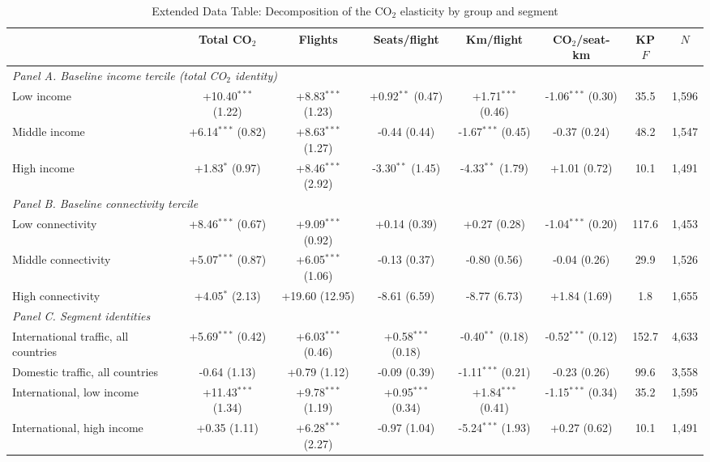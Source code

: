\begin{table}[htbp]
\centering
\begin{threeparttable}
\caption{Extended Data Table: Decomposition of the CO$_2$ elasticity by group and segment}
\label{tab:decomp_hetero}
\scriptsize
\begin{tabular}{lccccccc}
\toprule
 & Total CO$_2$ & Flights & Seats/flight & Km/flight & CO$_2$/seat-km & KP $F$ & $N$ \\
\midrule
\multicolumn{8}{l}{\textit{Panel A. Baseline income tercile (total CO$_2$ identity)}} \\
  Low income & +10.40$^{***}$ (1.22) & +8.83$^{***}$ (1.23) & +0.92$^{**}$ (0.47) & +1.71$^{***}$ (0.46) & -1.06$^{***}$ (0.30) & 35.5 & 1,596 \\
  Middle income & +6.14$^{***}$ (0.82) & +8.63$^{***}$ (1.27) & -0.44 (0.44) & -1.67$^{***}$ (0.45) & -0.37 (0.24) & 48.2 & 1,547 \\
  High income & +1.83$^{*}$ (0.97) & +8.46$^{***}$ (2.92) & -3.30$^{**}$ (1.45) & -4.33$^{**}$ (1.79) & +1.01 (0.72) & 10.1 & 1,491 \\
\multicolumn{8}{l}{\textit{Panel B. Baseline connectivity tercile}} \\
  Low connectivity & +8.46$^{***}$ (0.67) & +9.09$^{***}$ (0.92) & +0.14 (0.39) & +0.27 (0.28) & -1.04$^{***}$ (0.20) & 117.6 & 1,453 \\
  Middle connectivity & +5.07$^{***}$ (0.87) & +6.05$^{***}$ (1.06) & -0.13 (0.37) & -0.80 (0.56) & -0.04 (0.26) & 29.9 & 1,526 \\
  High connectivity & +4.05$^{*}$ (2.13) & +19.60 (12.95) & -8.61 (6.59) & -8.77 (6.73) & +1.84 (1.69) & 1.8 & 1,655 \\
\multicolumn{8}{l}{\textit{Panel C. Segment identities}} \\
  International traffic, all countries & +5.69$^{***}$ (0.42) & +6.03$^{***}$ (0.46) & +0.58$^{***}$ (0.18) & -0.40$^{**}$ (0.18) & -0.52$^{***}$ (0.12) & 152.7 & 4,633 \\
  Domestic traffic, all countries & -0.64 (1.13) & +0.79 (1.12) & -0.09 (0.39) & -1.11$^{***}$ (0.21) & -0.23 (0.26) & 99.6 & 3,558 \\
  International, low income & +11.43$^{***}$ (1.34) & +9.78$^{***}$ (1.19) & +0.95$^{***}$ (0.34) & +1.84$^{***}$ (0.41) & -1.15$^{***}$ (0.34) & 35.2 & 1,595 \\
  International, high income & +0.35 (1.11) & +6.28$^{***}$ (2.27) & -0.97 (1.04) & -5.24$^{***}$ (1.93) & +0.27 (0.62) & 10.1 & 1,491 \\

\end{tabular}
\end{threeparttable}
\end{table}
